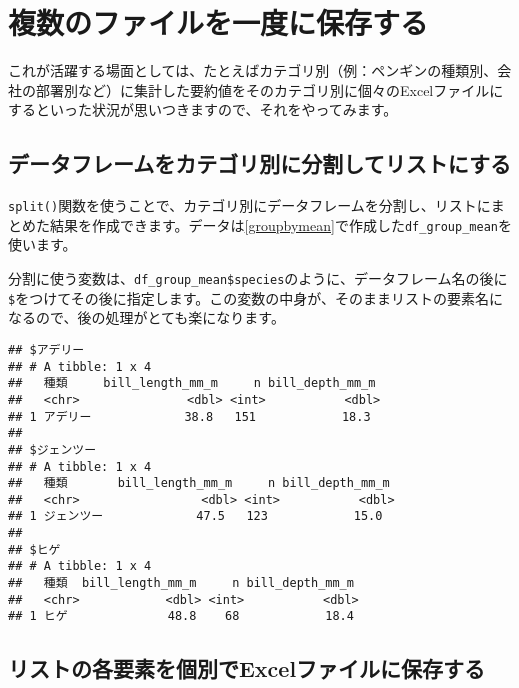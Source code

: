 \documentclass[
  xelatex,ja=standard, b5paper]{bxjsbook}
\newenvironment{Shaded}{\begin{snugshade}}{\end{snugshade}}
\newcommand{\FunctionTok}[1]{\textcolor[rgb]{0.00,0.00,0.00}{#1}}
\newcommand{\NormalTok}[1]{#1}
\newcommand{\OtherTok}[1]{\textcolor[rgb]{0.56,0.35,0.01}{#1}}
\newcommand{\SpecialCharTok}[1]{\textcolor[rgb]{0.00,0.00,0.00}{#1}}
\begin{document}
\hypertarget{writeseveralexcel}{%
\section{複数のファイルを一度に保存する}\label{writeseveralexcel}}

これが活躍する場面としては、たとえばカテゴリ別（例：ペンギンの種類別、会社の部署別など）に集計した要約値をそのカテゴリ別に個々のExcelファイルにするといった状況が思いつきますので、それをやってみます。

\hypertarget{splitdf}{%
\subsection{データフレームをカテゴリ別に分割してリストにする}\label{splitdf}}

\texttt{split()}関数を使うことで、カテゴリ別にデータフレームを分割し、リストにまとめた結果を作成できます。データは\ref{groupbymean}で作成した\texttt{df\_group\_mean}を使います。

分割に使う変数は、\texttt{df\_group\_mean\$species}のように、データフレーム名の後に\texttt{\$}をつけてその後に指定します。この変数の中身が、そのままリストの要素名になるので、後の処理がとても楽になります。

\begin{Shaded}
\end{Shaded}

\begin{verbatim}
## $アデリー
## # A tibble: 1 x 4
##   種類     bill_length_mm_m     n bill_depth_mm_m
##   <chr>               <dbl> <int>           <dbl>
## 1 アデリー             38.8   151            18.3
## 
## $ジェンツー
## # A tibble: 1 x 4
##   種類       bill_length_mm_m     n bill_depth_mm_m
##   <chr>                 <dbl> <int>           <dbl>
## 1 ジェンツー             47.5   123            15.0
## 
## $ヒゲ
## # A tibble: 1 x 4
##   種類  bill_length_mm_m     n bill_depth_mm_m
##   <chr>            <dbl> <int>           <dbl>
## 1 ヒゲ              48.8    68            18.4
\end{verbatim}

\hypertarget{ux30eaux30b9ux30c8ux306eux5404ux8981ux7d20ux3092ux500bux5225ux3067excelux30d5ux30a1ux30a4ux30ebux306bux4fddux5b58ux3059ux308b}{%
\subsection{リストの各要素を個別でExcelファイルに保存する}\label{ux30eaux30b9ux30c8ux306eux5404ux8981ux7d20ux3092ux500bux5225ux3067excelux30d5ux30a1ux30a4ux30ebux306bux4fddux5b58ux3059ux308b}}
\end{document}
